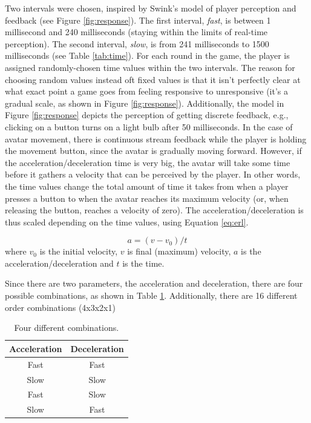 Two intervals were chosen, inspired by Swink's model of player perception and feedback (see Figure \ref{fig:response}). The first interval, \textit{fast}, is between 1 millisecond and 240 milliseconds (staying within the limits of real-time perception). The second interval, \textit{slow}, is from 241 milliseconds to 1500 milliseconds (see Table \ref{tab:time}). For each round in the game, the player is assigned randomly-chosen time values within the two intervals. The reason for choosing random values instead oft fixed values is that it isn't perfectly clear at what exact point a game goes from feeling responsive to unresponsive (it's a gradual scale, as shown in Figure \ref{fig:response}). Additionally, the model in Figure \ref{fig:response} depicts the perception of getting discrete feedback, e.g., clicking on a button turns on a light bulb after 50 milliseconds. In the case of avatar movement, there is continuous stream feedback while the player is holding the movement button, since the avatar is gradually moving forward. However, if the acceleration/deceleration time is very big, the avatar will take some time before it gathers a velocity that can be perceived by the player. In other words, the time values change the total amount of time it takes from when a player presses a button to when the avatar reaches its maximum velocity (or, when releasing the button, reaches a velocity of zero). The acceleration/deceleration is thus scaled depending on the time values, using Equation \ref{eq:erl}.

\begin{equation} \label{eq:erl}
a = (v - v_0)/t
\end{equation} 
where $v_0$ is the initial velocity, $v$ is final (maximum) velocity, $a$ is the acceleration/deceleration and $t$ is the time.

Since there are two parameters, the acceleration and deceleration, there are four possible combinations, as shown in Table \ref{tab:combinations}. Additionally, there are 16 different order combinations (4x3x2x1)

\begin{table}[htbp]
\centering
\begin{tabular}{|c|c|}
\hline \textbf{Acceleration}
& \textbf{Deceleration}\\\hline
Fast
& Fast
\\\hline
Slow
& Slow
\\\hline
Fast
& Slow
\\\hline
Slow
& Fast
\\\hline
\end{tabular}
\caption{Four different combinations.}
\label{tab:combinations}
\end{table}

